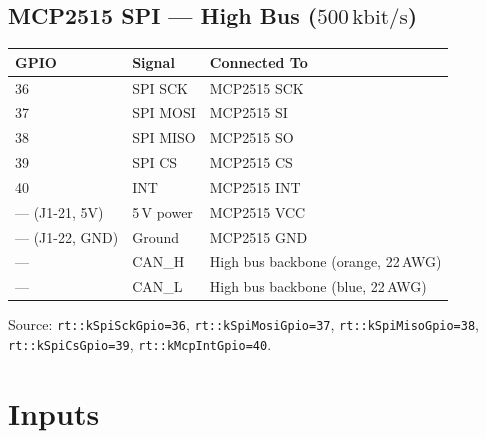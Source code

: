 \documentclass[12pt,a4paper,oneside]{report}
\newcommand{\bitrate}[1]{\ensuremath{#1\,\text{kbit/s}}}
\begin{document}
\subsection{MCP2515 SPI --- High Bus (\bitrate{500})}

\begin{center}
\begin{tabular}{lll}
\toprule
\textbf{GPIO} & \textbf{Signal} & \textbf{Connected To} \\
\midrule
36 & SPI SCK  & MCP2515 SCK \\
37 & SPI MOSI & MCP2515 SI \\
38 & SPI MISO & MCP2515 SO \\
39 & SPI CS   & MCP2515 CS \\
40 & INT      & MCP2515 INT \\
--- (J1-21, 5V)  & 5\,V power & MCP2515 VCC \\
--- (J1-22, GND) & Ground     & MCP2515 GND \\
--- & CAN\_H & High bus backbone (orange, 22\,AWG) \\
--- & CAN\_L & High bus backbone (blue, 22\,AWG) \\
\bottomrule
\end{tabular}
\end{center}

\noindent Source: \texttt{rt::kSpiSckGpio=36}, \texttt{rt::kSpiMosiGpio=37}, \texttt{rt::kSpiMisoGpio=38}, \texttt{rt::kSpiCsGpio=39}, \texttt{rt::kMcpIntGpio=40}.

\section{Inputs}
\end{document}
